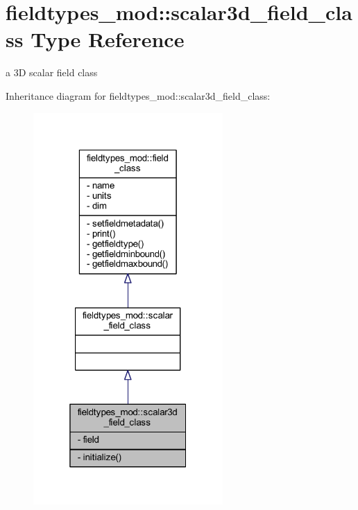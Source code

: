 \hypertarget{structfieldtypes__mod_1_1scalar3d__field__class}{}\section{fieldtypes\+\_\+mod\+:\+:scalar3d\+\_\+field\+\_\+class Type Reference}
\label{structfieldtypes__mod_1_1scalar3d__field__class}


a 3D scalar field class  




Inheritance diagram for fieldtypes\+\_\+mod\+:\+:scalar3d\+\_\+field\+\_\+class\+:\nopagebreak
\begin{figure}[H]
\begin{center}
\leavevmode
\includegraphics[width=205pt]{structfieldtypes__mod_1_1scalar3d__field__class__inherit__graph}
\end{center}
\end{figure}


